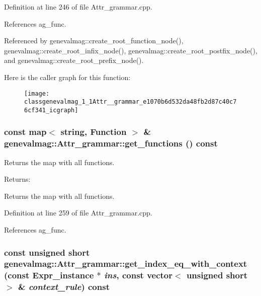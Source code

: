 Definition at line 246 of file Attr\_\-grammar.cpp.

References ag\_\-func.

Referenced by genevalmag::create\_\-root\_\-function\_\-node(), genevalmag::create\_\-root\_\-infix\_\-node(), genevalmag::create\_\-root\_\-postfix\_\-node(), and genevalmag::create\_\-root\_\-prefix\_\-node().

Here is the caller graph for this function:\nopagebreak
\begin{figure}[H]
\begin{center}
\leavevmode
\texttt{[image: classgenevalmag\_1\_1Attr\_\_grammar\_e1070b6d532da48fb2d87c40c76cf341\_icgraph]}
\end{center}
\end{figure}
\hypertarget{classgenevalmag_1_1Attr__grammar_e9743e35703d55c1d9594d7061340b9b}{
\subsubsection[{get\_\-functions}]{\setlength{\rightskip}{0pt plus 5cm}const map$<$ string, {\bf Function} $>$ \& genevalmag::Attr\_\-grammar::get\_\-functions () const}}
\label{classgenevalmag_1_1Attr__grammar_e9743e35703d55c1d9594d7061340b9b}


Returns the map with all functions. \begin{Desc}
\item[Returns:]\end{Desc}
Returns the map with all functions. 

Definition at line 259 of file Attr\_\-grammar.cpp.

References ag\_\-func.\hypertarget{classgenevalmag_1_1Attr__grammar_47242caf1e804a8fc50e0ab75ea39570}{
\subsubsection[{get\_\-index\_\-eq\_\-with\_\-context}]{\setlength{\rightskip}{0pt plus 5cm}const unsigned short genevalmag::Attr\_\-grammar::get\_\-index\_\-eq\_\-with\_\-context (const {\bf Expr\_\-instance} $\ast$ {\em ins}, \/  const vector$<$ unsigned short $>$ \& {\em context\_\-rule}) const}}
\label{classgenevalmag_1_1Attr__grammar_47242caf1e804a8fc50e0ab75ea39570}


